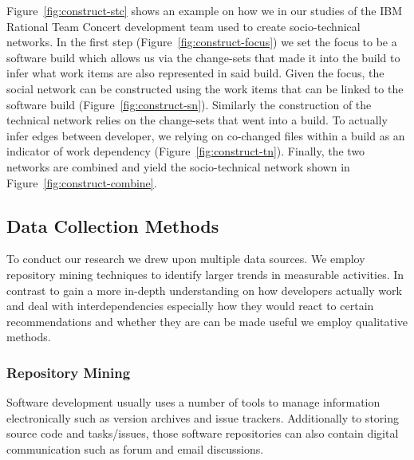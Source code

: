 Figure~\ref{fig:construct-stc} shows an example on how we in our studies of the IBM Rational Team Concert development team used to create socio-technical networks.
In the first step (Figure~\ref{fig:construct-focus}) we set the focus to be a software build which allows us via the change-sets that made it into the build to infer what work items are also represented in said build.
Given the focus, the social network can be constructed using the work items that can be linked to the software build (Figure~\ref{fig:construct-sn}).
Similarly the construction of the technical network relies on the change-sets that went into a build. 
To actually infer edges between developer, we relying on co-changed files within a build as an indicator of work dependency (Figure~\ref{fig:construct-tn}).
Finally, the two networks are combined and yield the socio-technical network shown in Figure~\ref{fig:construct-combine}.

\subsection{Data Collection Methods}
\label{c5:sec:datacollection}
To conduct our research we drew upon multiple data sources.
We employ repository mining techniques to identify larger trends in measurable activities.
In contrast to gain a more in-depth understanding on how developers actually work and deal with interdependencies especially how they would react to certain recommendations and whether they are can be made useful we employ qualitative methods.

\subsubsection{Repository Mining}
Software development usually uses a number of tools to manage information electronically such as version archives and issue trackers.
Additionally to storing source code and tasks/issues, those software repositories can also contain digital communication such as forum and email discussions.


